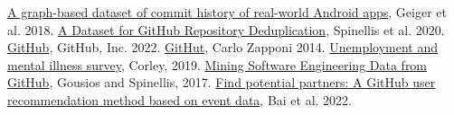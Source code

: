 \documentclass{article}
\theoremstyle{theorem}
\theoremstyle{definition}
\theoremstyle{remark}
\begin{document}
\begin{thebibliography}{99}
 \href{https://dl.acm.org/doi/abs/10.1145/3196398.3196460}{A graph-based dataset of commit history of real-world Android apps}, Geiger et al. 2018.
 \href{https://dl.acm.org/doi/abs/10.1145/3379597.3387496}{A Dataset for GitHub Repository Deduplication}, Spinellis et al. 2020.
 \href{https://github.com}{GitHub}, GitHub, Inc. 2022.
 \href{githut.info}{GitHut}, Carlo Zapponi 2014.
 \href{https://www.kaggle.com/datasets/michaelacorley/unemployment-and-mental-illness-survey}{Unemployment and mental illness survey}, Corley, 2019.
 \href{https://gousios.org/pub/mining-soft-eng-data-github.pdf}{Mining Software Engineering Data from GitHub}, Gousios and Spinellis, 2017.
 \href{https://www.sciencedirect.com/science/article/abs/pii/S0950584922001033}{Find potential partners: A GitHub user recommendation method based on event data}, Bai et al. 2022.
\end{thebibliography}
\end{document}
